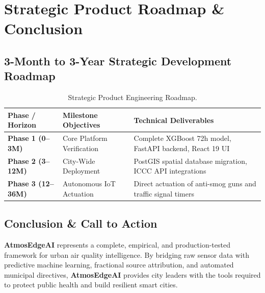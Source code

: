 \documentclass[11pt, a4paper]{article}
\newcommand{\atmosedge}{\textbf{\textcolor{mainblue}{AtmosEdgeAI}}}
\begin{document}
\section{Strategic Product Roadmap \& Conclusion}

\subsection{3-Month to 3-Year Strategic Development Roadmap}

\begin{table}[H]
\centering
\small
{}
\begin{tabularx}{\textwidth}{L{3.0cm} L{5.0cm} Y}
\toprule
{}
\textbf{Phase / Horizon} & \textbf{Milestone Objectives} & \textbf{Technical Deliverables} \\
\midrule
\textbf{Phase 1 (0--3M)} & Core Platform Verification & Complete XGBoost 72h model, FastAPI backend, React 19 UI \\
\textbf{Phase 2 (3--12M)} & City-Wide Deployment & PostGIS spatial database migration, ICCC API integrations \\
\textbf{Phase 3 (12--36M)} & Autonomous IoT Actuation & Direct actuation of anti-smog guns and traffic signal timers \\
\bottomrule
\end{tabularx}
\caption{Strategic Product Engineering Roadmap.}
\end{table}

\subsection{Conclusion \& Call to Action}
\atmosedge{} represents a complete, empirical, and production-tested framework for urban air quality intelligence. By bridging raw sensor data with predictive machine learning, fractional source attribution, and automated municipal directives, \atmosedge{} provides city leaders with the tools required to protect public health and build resilient smart cities.

\vspace{0.3cm}

\begin{center}
\end{center}
\end{document}
